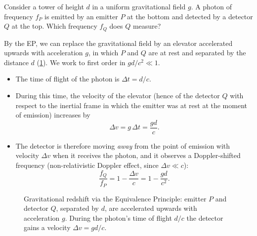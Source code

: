 Consider a tower of height $d$ in a uniform gravitational field $g$. A photon of frequency $f_P$ is emitted by an emitter $P$ at the bottom and detected by a detector $Q$ at the top. Which frequency $f_Q$ does $Q$ measure?

By the EP, we can replace the gravitational field by an elevator accelerated upwards with acceleration $g$, in which $P$ and $Q$ are at rest and separated by the distance $d$ (\cref{fig:redshift}). We work to first order in $gd/c^2\ll 1$.
\begin{itemize}
  \item The time of flight of the photon is $\Delta t= d/c$.
  \item During this time, the velocity of the elevator (hence of the detector $Q$ with respect to the inertial frame in which the emitter was at rest at the moment of emission) increases by
  \begin{equation}
    \Delta v = g\,\Delta t = \frac{g d}{c}.
  \end{equation}
  \item The detector is therefore moving \emph{away} from the point of emission with velocity $\Delta v$ when it receives the photon, and it observes a Doppler-shifted frequency (non-relativistic Doppler effect, since $\Delta v\ll c$):
  \begin{equation}
    \frac{f_Q}{f_P} = 1-\frac{\Delta v}{c} = 1-\frac{g d}{c^2}.
  \end{equation}
\end{itemize}

\begin{figure}[ht]
\centering
{}
\caption{Gravitational redshift via the Equivalence Principle: emitter $P$ and detector $Q$, separated by $d$, are accelerated upwards with acceleration $g$. During the photon's time of flight $d/c$ the detector gains a velocity $\Delta v=gd/c$.}
\label{fig:redshift}
\end{figure}

